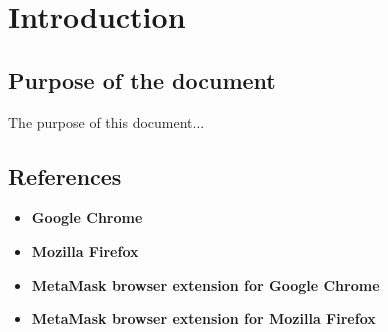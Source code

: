\documentclass[ManualeUtente.tex]{subfiles}
\begin{document}
\chapter{Introduction}

	\section{Purpose of the document}
	The purpose of this document...
	
	\scopoProdottoEN
	
	\section{References}
		\begin{itemize}
			\item \textbf{Google Chrome}\\
			\item \textbf{Mozilla Firefox}\\
			\item \textbf{MetaMask browser extension for Google Chrome}\\
			\item \textbf{MetaMask browser extension for Mozilla Firefox}\\
		\end{itemize}
\end{document}
